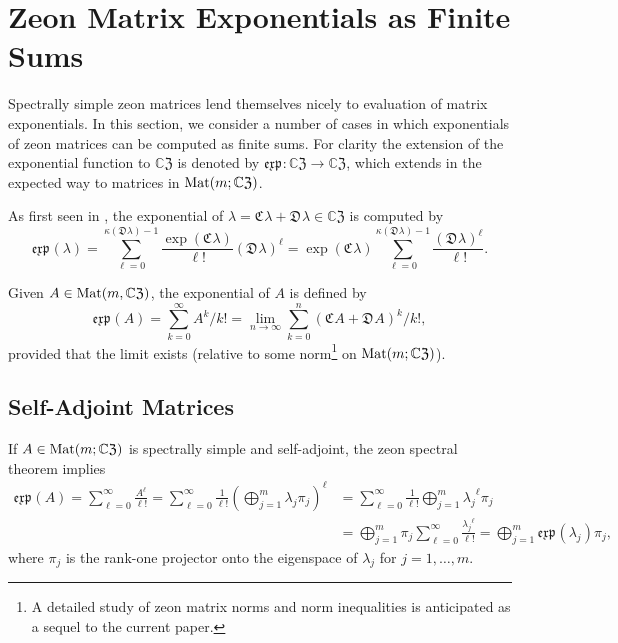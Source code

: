 \documentclass{article}
\theoremstyle{definition}
\newcommand{\zexp}{\mathfrak{exp}\mspace{1mu}}
\newcommand{\zco}{\mathfrak{C}\mspace{1mu}}
\newcommand{\zdu}{\mathfrak{D}\mspace{1mu}}
\newcommand{\CZ}{\mathbb{C}\mathfrak{Z}}
\newcommand{\Mat}{{\rm Mat}}
\numberwithin{equation}{section}
\begin{document}
\section{Zeon Matrix Exponentials as Finite Sums}\label{zeon matrix exponential}

Spectrally simple zeon matrices lend themselves nicely to evaluation of matrix exponentials.  In this section, we consider a number of cases in which exponentials of zeon matrices can be computed as finite sums.  For clarity the extension of the exponential function to $\CZ$ is denoted by $\zexp:\CZ\to \CZ$, which extends in the expected way to matrices in $\Mat(m;\CZ)$.

As first seen in \cite{staplesweygandt}, the exponential of $\lambda=\zco\lambda+\zdu \lambda\in\CZ$ is computed by \begin{equation*}
\zexp(\lambda)=\sum_{\ell=0}^{\kappa(\zdu \lambda)-1}\frac{\exp(\zco \lambda)}{\ell!}(\zdu \lambda)^\ell
=\exp(\zco \lambda)\sum_{\ell=0}^{\kappa(\zdu\lambda)-1}\frac{(\zdu \lambda)^\ell}{\ell!}.
\end{equation*}

Given $A\in\Mat(m,\CZ)$, the exponential of $A$ is defined by   
\begin{equation}\label{matrix exp def}
\zexp(A)=\sum_{k=0}^\infty A^k/k!=\lim_{n\to\infty}\sum_{k=0}^n (\zco A+\zdu A)^k/k!,
\end{equation}
provided that the limit exists (relative to some norm\footnote{A detailed study of zeon matrix norms and norm inequalities is anticipated as a sequel to the current paper.} on $\Mat(m;\CZ)$).    

\subsection{Self-Adjoint Matrices}

If $A\in\Mat(m;\CZ)$ is spectrally simple and self-adjoint, the zeon spectral theorem implies \begin{align*}
\zexp(A)=\sum_{\ell=0}^{\infty}\frac{A^\ell}{\ell!}=\sum_{\ell=0}^{\infty}\frac{1}{\ell!}\left(\bigoplus_{j=1}^{m}\lambda_j\pi_j\right)^\ell&=\sum_{\ell=0}^{\infty}\frac{1}{\ell!}\bigoplus_{j=1}^{m}{\lambda_j}^\ell\pi_j\\
&=\bigoplus_{j=1}^m\pi_j\sum_{\ell=0}^\infty\frac{{\lambda_j}^\ell}{\ell!}=\bigoplus_{j=1}^m \zexp(\lambda_j)\pi_j,
\end{align*}
where $\pi_j$ is the rank-one projector onto the eigenspace of $\lambda_j$ for $j=1, \ldots, m$.
\end{document}
